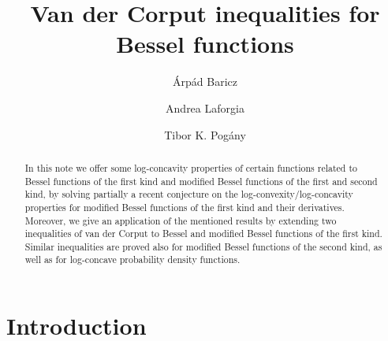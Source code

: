 \documentclass[10pt]{amsart}
\title{Van der Corput inequalities for Bessel functions}
\author[\'A. Baricz]{\'Arp\'ad Baricz}
\author[A. Laforgia]{Andrea Laforgia}
\author[T.K. Pog\'any]{Tibor K. Pog\'any}
\date{}
\begin{document}
\maketitle

\begin{abstract}
In this note we offer some log-concavity
properties of certain functions related to Bessel functions of the first kind and modified Bessel
functions of the first and second kind, by solving partially a recent conjecture on the log-convexity/log-concavity
properties for modified Bessel functions of the first kind and their derivatives.  Moreover, we give an application of
the mentioned results by extending two inequalities of van der
Corput to Bessel and modified Bessel functions of the first kind. Similar inequalities are proved also for
modified Bessel functions of the second kind, as well as for log-concave probability density functions.
\end{abstract}

\section{\bf Introduction}
\setcounter{equation}{0}
\end{document}
